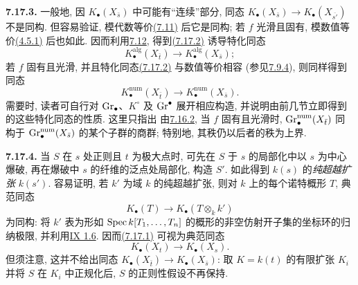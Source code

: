 \textbf{7.17.3.} 一般地, 因 $K_\bullet(X_{\bar s})$ 中可能有“连续”部分, 同态 $K_\bullet(X_{\bar s})\to K_\bullet(X_{\overline{s'}})$ 不是同构. 但容易验证, 模代数等价\hyperlink{sga6.e10.para.7-11}{(7.11)} 后它是同构; 若 $f$ 光滑且固有, 模数值等价\hyperlink{sga6.e10.def.4-5-1}{(4.5.1)} 后也如此. 因而利用\hyperlink{sga6.e10.para.7-12}{7.12}, 得到\hyperlink{sga6.e10.eq.7-17-2}{(7.17.2)} 诱导特化同态
%
%
%
%
%
%
%
\begin{equation}\tag{7.17.3.1}
K_\bullet^{\mathrm{alg}}(X_{\bar t})
  \longrightarrow K_\bullet^{\mathrm{alg}}(X_{\bar s});
\end{equation}
若 $f$ 固有且光滑, 并且特化同态\hyperlink{sga6.e10.eq.7-17-2}{(7.17.2)} 与数值等价相容 (参见\hyperlink{sga6.e10.para.7-9-4}{7.9.4}), 则同样得到同态
%
%
\begin{equation}\tag{7.17.3.2}
K_\bullet^{\mathrm{num}}(X_{\bar t})
  \longrightarrow K_\bullet^{\mathrm{num}}(X_{\bar s}).
\end{equation}
需要时, 读者可自行对 $\operatorname{Gr}_\bullet$、$K^\circ$ 及 $\operatorname{Gr}^\bullet$ 展开相应构造, 并说明由前几节立即得到的这些特化同态的性质. 这里只指出
%
%
%
由\hyperlink{sga6.e10.para.7-16-2}{7.16.2}, 当 $f$ 固有且光滑时, $\operatorname{Gr}_\bullet^{\mathrm{num}}(X_{\bar t})$ 同构于 $\operatorname{Gr}_\bullet^{\mathrm{num}}(X_{\bar s})$ 的某个子群的商群; 特别地, 其秩仍以后者的秩为上界.
%
%
%

\textbf{7.17.4.} 当 $S$ 在 $s$ 处正则且 $t$ 为极大点时, 可先在 $S$ 于 $s$ 的局部化中以 $s$ 为中心爆破, 再在爆破中 $s$ 的纤维的泛点处局部化, 构造 $S'$. 如此得到 $k(s)$ 的\emph{纯超越扩张} $k(s')$. 容易证明, 若 $k'$ 为域 $k$ 的纯超越扩张, 则对 $k$ 上的每个诺特概形 $T$, 典范同态
%
%
%
%
%
%
%
\[
K_\bullet(T)\longrightarrow K_\bullet(T\otimes_k k')
\]
为同构: 将 $k'$ 表为形如 $\operatorname{Spec} k[T_1,\ldots,T_n]$ 的概形的非空仿射开子集的坐标环的归纳极限, 并利用\hyperlink{sga6.e09.prop.1-6}{IX 1.6}. 因而\hyperlink{sga6.e10.eq.7-17-1}{(7.17.1)} 可视为典范同态
%
%
%
\begin{equation}\tag{7.17.4.1}
K_\bullet(X_t)\longrightarrow K_\bullet(X_s).
\end{equation}
但须注意, 这并不给出同态 $K_\bullet(X_{\bar t})\to K_\bullet(X_{\bar s})$: 取 $K=k(t)$ 的有限扩张 $K_i$ 并将 $S$ 在 $K_i$ 中正规化后, $S$ 的正则性假设不再保持.
%
%
%

